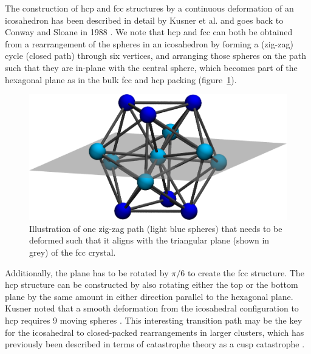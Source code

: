 The construction of hcp and fcc structures by a continuous deformation of an
icosahedron has been described in detail by Kusner et al.
\autocite{Kusner_ConfigurationSpacesEqual_2016} and goes back to Conway and Sloane
in 1988 \autocite{Conway_SpherePackingsLattices_1999}. We note that hcp and fcc can both be obtained
from a rearrangement of the spheres in an icosahedron by forming a (zig-zag)
cycle (closed path) through six vertices, and arranging those spheres on the
path such that they are in-plane with the central sphere, which becomes part of
the hexagonal plane as in the bulk fcc and hcp packing
(figure~\ref{fig:ico-fcc-trans}).
\begin{figure}[htb]
    \centering
    \includegraphics[width=.8\columnwidth]{gregory-newton/plane.png}
    \caption{Illustration of one zig-zag path (light blue spheres) that needs
    to be deformed such that it aligns with the triangular plane (shown in
    grey) of the fcc crystal.}
    \label{fig:ico-fcc-trans}
\end{figure}
Additionally, the plane has to be rotated by $\pi/6$ to create the fcc
structure. The hcp structure can be constructed by also rotating either the top
or the bottom plane by the same amount in either direction parallel to the
hexagonal plane. Kusner noted that a smooth deformation from the icosahedral
configuration to hcp requires 9 moving spheres
\autocite{Kusner_ConfigurationSpacesEqual_2016}. This interesting transition path
may be the key for the icosahedral to closed-packed rearrangements in larger
clusters, which has previously been described in terms of catastrophe theory as
a cusp catastrophe \autocite{Wales_MicroscopicBasisGlobal_2001}. 

